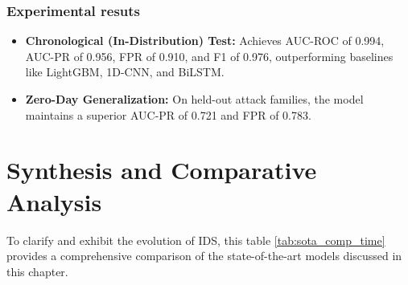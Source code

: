 \documentclass[12pt, a4paper]{report}
\begin{document}
\subsubsection{Experimental resuts}
\begin{itemize}
    \item \textbf{Chronological (In-Distribution) Test:} Achieves AUC-ROC of 0.994, AUC-PR of 0.956, FPR of 0.910, and F1 of 0.976, outperforming baselines like LightGBM, 1D-CNN, and BiLSTM.
    \item \textbf{Zero-Day Generalization:} On held-out attack families, the model maintains a superior AUC-PR of 0.721 and FPR of 0.783.
\end{itemize}


\section{Synthesis and Comparative Analysis}

To clarify and exhibit the evolution of IDS, this table \ref{tab:sota_comp_time} provides a comprehensive comparison of the state-of-the-art models discussed in this chapter. 
\end{document}
